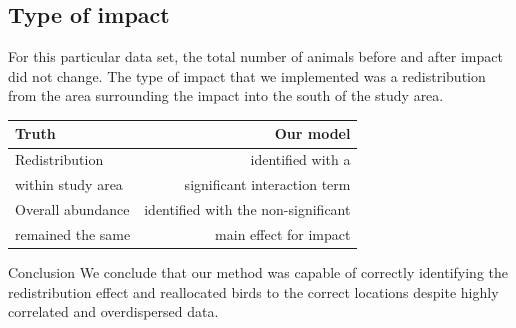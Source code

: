 \subsection{Type of impact}
For this particular data set, the total number of animals before and after impact did not change. The type of impact that we implemented was a redistribution from the area surrounding the impact into the south of the study area. 
\begin{table}[ht!]
\begin{tabular}{l|r}
\textbf{Truth} & \textbf{Our model}\\
\hline
Redistribution  & identified with a \\
within study area & significant interaction term\\
\hline
Overall abundance  & identified with the non-significant \\
remained the same & main effect for impact\\
\end{tabular}
\end{table}
\begin{block}{Conclusion}
We conclude that our method was capable of correctly identifying the redistribution effect and reallocated birds to the correct locations despite highly correlated and overdispersed data. \\
\end{block}

%
